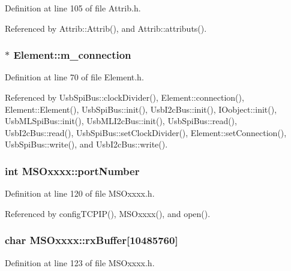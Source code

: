 Definition at line 105 of file Attrib.h.

Referenced by Attrib::Attrib(), and Attrib::attributs().\hypertarget{classElement_abe3de7a5dbbc9a6dd2d7e012e5fdb266}{
\subsubsection[{m\_\-connection}]{$\ast$ {\bf Element::m\_\-connection}}}
\label{classElement_abe3de7a5dbbc9a6dd2d7e012e5fdb266}


Definition at line 70 of file Element.h.

Referenced by UsbSpiBus::clockDivider(), Element::connection(), Element::Element(), UsbSpiBus::init(), UsbI2cBus::init(), IOobject::init(), UsbMLSpiBus::init(), UsbMLI2cBus::init(), UsbSpiBus::read(), UsbI2cBus::read(), UsbSpiBus::setClockDivider(), Element::setConnection(), UsbSpiBus::write(), and UsbI2cBus::write().\hypertarget{classMSOxxxx_a242bcf72c701cd20d86d25315fc6180f}{
\subsubsection[{portNumber}]{\setlength{\rightskip}{0pt plus 5cm}int {\bf MSOxxxx::portNumber}}}
\label{classMSOxxxx_a242bcf72c701cd20d86d25315fc6180f}


Definition at line 120 of file MSOxxxx.h.

Referenced by configTCPIP(), MSOxxxx(), and open().\hypertarget{classMSOxxxx_a1a50770759caada18087ca8ffb96f357}{
\subsubsection[{rxBuffer}]{\setlength{\rightskip}{0pt plus 5cm}char {\bf MSOxxxx::rxBuffer}\mbox{[}10485760\mbox{]}}}
\label{classMSOxxxx_a1a50770759caada18087ca8ffb96f357}


Definition at line 123 of file MSOxxxx.h.

